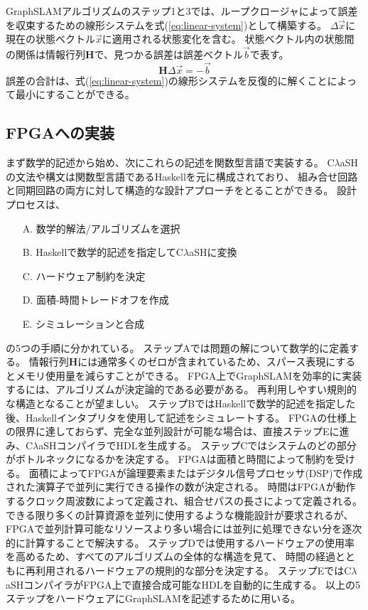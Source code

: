 \documentclass{jsarticle}
\begin{document}
GraphSLAMアルゴリズムのステップ1と3では、ループクロージャによって誤差を収束するための線形システムを式(\ref{eq:linear-system})として構築する。
$\Delta\vec{x}$に現在の状態ベクトル$\vec{x}$に適用される状態変化を含む。
状態ベクトル内の状態間の関係は情報行列$\mathbf{H}$で、見つかる誤差は誤差ベクトル$\vec{b}$で表す。
\begin{equation}
    \mathbf{H}\Delta\vec{x}=-\vec{b} \label{eq:linear-system}
\end{equation}
誤差の合計は、式(\ref{eq:linear-system})の線形システムを反復的に解くことによって最小にすることができる。

\subsection{FPGAへの実装}
まず数学的記述から始め、次にこれらの記述を関数型言語で実装する。
C$\lambda$aSHの文法や構文は関数型言語であるHaskellを元に構成されており、
組み合せ回路と同期回路の両方に対して構造的な設計アプローチをとることができる。
設計プロセスは、
\begin{itemize}
    \item[A.] 数学的解法/アルゴリズムを選択
    \item[B.] Haskellで数学的記述を指定してC$\lambda$aSHに変換
    \item[C.] ハードウェア制約を決定
    \item[D.] 面積-時間トレードオフを作成
    \item[E.] シミュレーションと合成
\end{itemize}
の5つの手順に分かれている。
ステップAでは問題の解について数学的に定義する。
情報行列$\mathbf{H}$には通常多くのゼロが含まれているため、スパース表現にするとメモリ使用量を減らすことができる。
FPGA上でGraphSLAMを効率的に実装するには、アルゴリズムが決定論的である必要がある。
再利用しやすい規則的な構造となることが望ましい。
ステップBではHaskellで数学的記述を指定した後、Haskellインタプリタを使用して記述をシミュレートする。
FPGAの仕様上の限界に達しておらず、完全な並列設計が可能な場合は、直接ステップEに進み、C$\lambda$aSHコンパイラでHDLを生成する。
ステップCではシステムのどの部分がボトルネックになるかを決定する。
FPGAは面積と時間によって制約を受ける。
面積によってFPGAが論理要素またはデジタル信号プロセッサ(DSP)で作成された演算子で並列に実行できる操作の数が決定される。
時間はFPGAが動作するクロック周波数によって定義され、組合せパスの長さによって定義される。
できる限り多くの計算資源を並列に使用するような機能設計が要求されるが、
FPGAで並列計算可能なリソースより多い場合には並列に処理できない分を逐次的に計算することで解決する。
ステップDでは使用するハードウェアの使用率を高めるため、すべてのアルゴリズムの全体的な構造を見て、
時間の経過とともに再利用されるハードウェアの規則的な部分を決定する。
ステップEではC$\lambda$aSHコンパイラがFPGA上で直接合成可能なHDLを自動的に生成する。
以上の5ステップをハードウェアにGraphSLAMを記述するために用いる。
\end{document}
